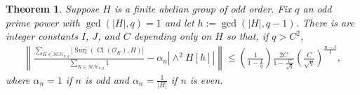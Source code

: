 \documentclass[12 pt]{amsart}
\theoremstyle{plain}
\newtheorem{theorem}[subsubsection]{Theorem}
\theoremstyle{definition}
\theoremstyle{remark}
\numberwithin{equation}{section}
\DeclareMathOperator\cl{Cl}
\DeclareMathOperator\surj{Surj}
\begin{document}
\begin{theorem}
	\label{theorem:moments-with-error}
	Suppose $H$ is a finite abelian group of odd order. 
	Fix $q$ an odd prime power with 
	$\gcd( |H|, q) = 1$ 
	and let 
	$h := \gcd(|H|, q - 1)$.
	There is are integer constants $I$, $J$, and $C$ depending only on $H$ so that,
	if $q > C^2$,
	\begin{align}
		\label{equation:repeated-hurwitz-point-count-from-components}
		\left \|  \frac{\sum_{K \in \mathcal{MH}_{n,q}}
		\left|\surj(\cl(\mathscr O_K), H)\right|} {\sum_{K \in \mathcal{MH}_{n,q}} 1} -
		\alpha_n \left|\wedge^2 H[h] \right| 
		\right \| \leq 
		\left(\frac{1}{1-\frac{1}{q}} \right)
		\frac{2C}{1- \frac{C}{\sqrt{q}}}
		\left(\frac{C}{\sqrt{q}}\right)^{\frac{n-J}{I}},
	\end{align}
	where $\alpha_n = 1$ if $n$ is odd and $\alpha_n = \frac{1}{|H|}$ if $n$
	is even.
\end{theorem}
\end{document}
